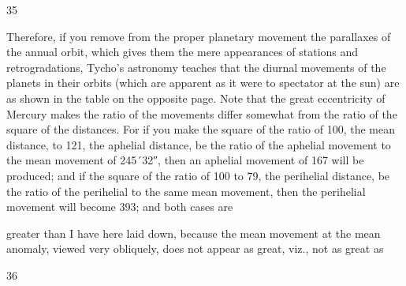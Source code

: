 \documentclass{article}
\begin{document}
35

Therefore, if you remove from the proper planetary movement the
parallaxes of the annual orbit, which gives them the mere appearances of
stations and retrogradations, Tycho's astronomy teaches that the diurnal
movements of the planets in their orbits (which are apparent as it were
to spectator at the sun) are as shown in the table on the opposite page.
Note that the great eccentricity of Mercury makes the ratio of the
movements differ somewhat from the ratio of the square of the
distances. For if you make the square of the ratio of 100, the mean
distance, to 121, the aphelial distance, be the ratio of the aphelial
movement to the mean movement of 245´32″, then an aphelial
movement of 167 will be produced; and if the square of the ratio of 100
to 79, the perihelial distance, be the ratio of the perihelial to the same
mean movement, then the perihelial movement will become 393; and
both cases are

greater than I have here laid down, because the mean movement at the
mean anomaly, viewed very obliquely, does not appear as great, viz., not
as great as


36
\end{document}
